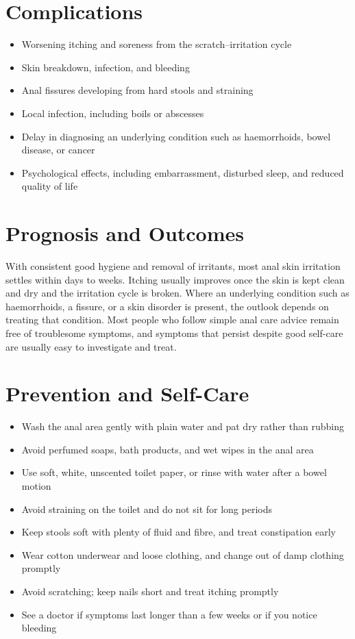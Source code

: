 \section*{Complications}
\begin{itemize}
    \item Worsening itching and soreness from the scratch--irritation cycle
    \item Skin breakdown, infection, and bleeding
    \item Anal fissures developing from hard stools and straining
    \item Local infection, including boils or abscesses
    \item Delay in diagnosing an underlying condition such as haemorrhoids, bowel disease, or cancer
    \item Psychological effects, including embarrassment, disturbed sleep, and reduced quality of life
\end{itemize}

\section*{Prognosis and Outcomes}
With consistent good hygiene and removal of irritants, most anal skin irritation settles within days to weeks. Itching usually improves once the skin is kept clean and dry and the irritation cycle is broken. Where an underlying condition such as haemorrhoids, a fissure, or a skin disorder is present, the outlook depends on treating that condition. Most people who follow simple anal care advice remain free of troublesome symptoms, and symptoms that persist despite good self-care are usually easy to investigate and treat.

\section*{Prevention and Self-Care}
\begin{itemize}
    \item Wash the anal area gently with plain water and pat dry rather than rubbing
    \item Avoid perfumed soaps, bath products, and wet wipes in the anal area
    \item Use soft, white, unscented toilet paper, or rinse with water after a bowel motion
    \item Avoid straining on the toilet and do not sit for long periods
    \item Keep stools soft with plenty of fluid and fibre, and treat constipation early
    \item Wear cotton underwear and loose clothing, and change out of damp clothing promptly
    \item Avoid scratching; keep nails short and treat itching promptly
    \item See a doctor if symptoms last longer than a few weeks or if you notice bleeding
\end{itemize}

